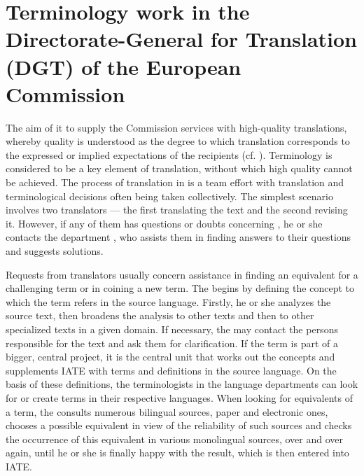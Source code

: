 \documentclass[output=paper]{langsci/langscibook}
\begin{document}
\section{Terminology work in the Directorate-General for Translation (DGT) of the European Commission}\label{sec:stefaniak:2}

The aim of  it to supply the Commission services with high-quality translations, whereby quality is understood as the degree to which translation corresponds to the expressed or implied expectations of the recipients (cf. \citeauthor{ISO2015b}). Terminology is considered to be a key element of translation, without which high quality cannot be achieved. The process of translation in  is a team effort with translation and terminological decisions often being taken collectively. The simplest scenario involves two translators — the first translating the text and the second revising it. However, if any of them has questions or doubts concerning , he or she contacts the department , who assists them in finding answers to their questions and suggests solutions.

Requests from translators usually concern assistance in finding an equivalent for a challenging term or in coining a new term. The  begins by defining the concept to which the term refers in the source language. Firstly, he or she analyzes the source text, then broadens the analysis to other  texts and then to other specialized texts in a given domain. If necessary, the  may contact the persons responsible for the text and ask them for clarification. If the term is part of a bigger, central project, it is the central  unit that works out the concepts and supplements IATE with terms and definitions in the source language. On the basis of these definitions, the terminologists in the language departments can look for or create terms in their respective languages. When looking for equivalents of a term, the  consults numerous bilingual sources, paper and electronic ones, chooses a possible equivalent in view of the reliability of such sources and checks the occurrence of this equivalent in various monolingual sources, over and over again, until he or she is finally happy with the result, which is then entered into IATE.
\end{document}
